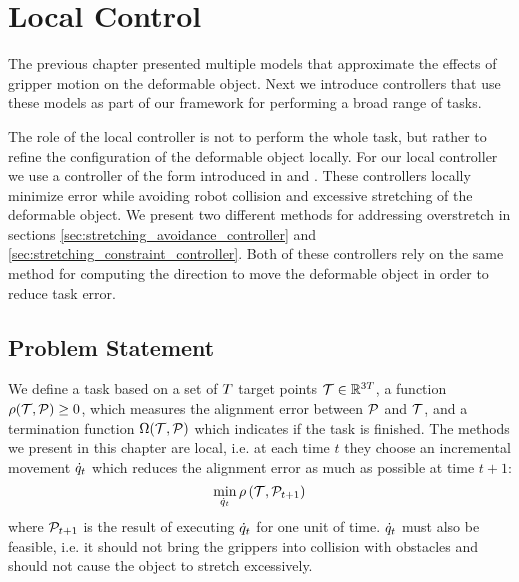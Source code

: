 \chapter{Local Control}
\label{chap:local_control}

The previous chapter presented multiple models that approximate the effects of gripper motion on the deformable object. Next we introduce controllers that use these models as part of our framework for performing a broad range of tasks.

The role of the local controller is not to perform the whole task, but rather to refine the configuration of the deformable object locally. For our local controller we use a controller of the form introduced in \cite{Berenson2013} and \cite{McConachie2018}. These controllers locally minimize error while avoiding robot collision and excessive stretching of the deformable object. We present two different methods for addressing overstretch in sections \ref{sec:stretching_avoidance_controller} and \ref{sec:stretching_constraint_controller}. Both of these controllers rely on the same method for computing the direction to move the deformable object in order to reduce task error.

\section{Problem Statement}

We define a task based on a set of $T$ target points $\mathcal{T} \in \mathbb{R}^{3 T}$, a function $\rho(\mathcal{T}, \mathcal{P}) \geq 0$, which measures the alignment error between $\mathcal{P}$ and $\mathcal{T}$, and a termination function $\Omega(\mathcal{T}, \mathcal{P})$ which indicates if the task is finished. The methods we present in this chapter are local, i.e. at each time $t$ they choose an incremental movement $\dot{q}_t$ which reduces the alignment error as much as possible at time $t+1$:
\begin{equation}
    \min_{\dot{q}_t} \rho \left(\mathcal{T}, \mathcal{P}_{t+1} \right)
    \label{eqn:ctrl_obj}
\end{equation}
where $\mathcal{P}_{t+1}$ is the result of executing $\dot{q}_t$ for one unit of time. $\dot{q}_t$ must also be feasible, i.e. it should not bring the grippers into collision with obstacles and should not cause the object to stretch excessively.


